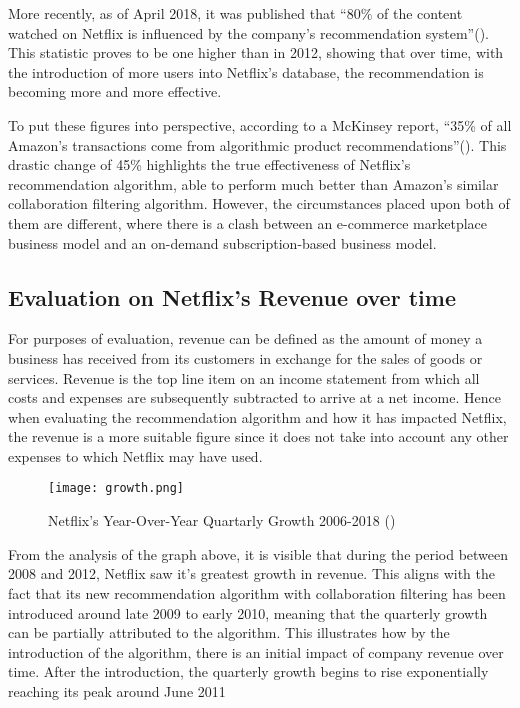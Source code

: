 \documentclass[12pt,a4paper]{article}
\begin{document}
More recently, as of April 2018, it was published that \enquote{80\% of the content watched on Netflix is influenced by the company’s recommendation system}(\cite{marr_2018}). This statistic proves to be one higher than in 2012, showing that over time, with the introduction of more users into Netflix's database, the recommendation is becoming more and more effective.

To put these figures into perspective, according to a McKinsey report, \enquote{35\% of all Amazon’s transactions come from algorithmic product recommendations}(\cite{mckinsey}). This drastic change of 45\% highlights the true effectiveness of Netflix's recommendation algorithm, able to perform much better than Amazon's similar collaboration filtering algorithm. However, the circumstances placed upon both of them are different, where there is a clash between an e-commerce marketplace business model and an on-demand subscription-based business model.

\subsection{Evaluation on Netflix's Revenue over time}

For purposes of evaluation, revenue can be defined as the amount of money a business has received from its customers in exchange for the sales of goods or services. Revenue is the top line item on an income statement from which all costs and expenses are subsequently subtracted to arrive at a net income. Hence when evaluating the recommendation algorithm and how it has impacted Netflix, the revenue is a more suitable figure since it does not take into account any other expenses to which Netflix may have used.

\begin{figure}[H]
	
	\centering
	\texttt{[image: growth.png]}
	\caption{Netflix's Year-Over-Year Quartarly Growth 2006-2018 (\cite{macrotrends})}
	
\end{figure}

From the analysis of the graph above, it is visible that during the period between 2008 and 2012, Netflix saw it's greatest growth in revenue. This aligns with the fact that its new recommendation algorithm with collaboration filtering has been introduced around late 2009 to early 2010, meaning that the quarterly growth can be partially attributed to the algorithm. This illustrates how by the introduction of the algorithm, there is an initial impact of company revenue over time. After the introduction, the quarterly growth begins to rise exponentially reaching its peak around June 2011
\end{document}
